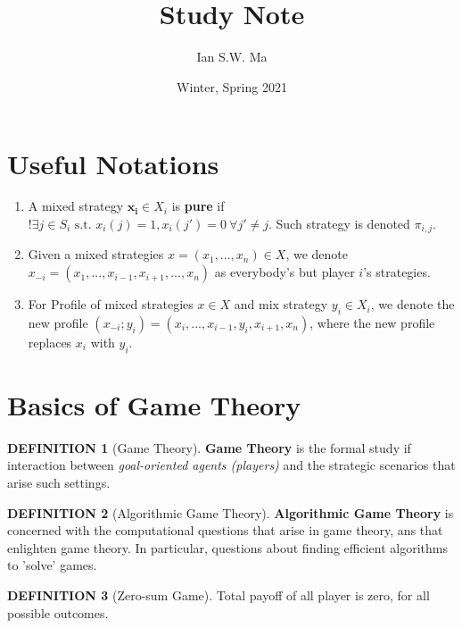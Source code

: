 \documentclass[12pt]{article}
\title{\coursename\\Study Note}
\author{Ian S.W. Ma}
\date{Winter, Spring 2021}
\theoremstyle{definition}
\newtheorem*{definition}{DEFINITION}
\newcommand{\suchthat}{\text{ s.t. }}
\begin{document}
\maketitle
\tableofcontents
\newpage

\setcounter{page}{1}
\setcounter{section}{-1}

\section{Useful Notations}
    \begin{enumerate}
        \item A mixed strategy $\bm{x_i} \in X_i$ is \textbf{pure} if $!\exists j \in S_i \suchthat x_i(j) = 1, x_i(j') = 0 \ \forall j' \neq j$. Such strategy is denoted $\pi_{i,j}$.
        \item Given a mixed strategies $x = (x_1,...,x_n) \in X$, we denote $x_{-i} = (x_1,...,x_{i-1},x_{i+1},...,x_n)$ as everybody's but player $i$'s strategies.
        \item For Profile of mixed strategies $x \in X$ and mix strategy $y_i \in X_i$, we denote the new profile $(x_{-i};y_i) = (x_i,...,x_{i-1},y_i,x_{i+1},x_n)$, where the new profile replaces $x_i$ with $y_i$. 
        \end{enumerate}

\section{Basics of Game Theory}
    \begin{definition}[Game Theory]
        \textbf{Game Theory} is the formal study if interaction between \textit{goal-oriented agents (players)} and the strategic scenarios that arise such settings.
    \end{definition}
    \begin{definition}[Algorithmic Game Theory]
        \textbf{Algorithmic Game Theory} is concerned with the computational questions that arise in game theory, ans that enlighten game theory. In particular, questions about finding efficient algorithms to 'solve' games.
    \end{definition}
    \begin{definition}[Zero-sum Game]
        Total payoff of all player is zero, for all possible outcomes.
    \end{definition}
\end{document}
